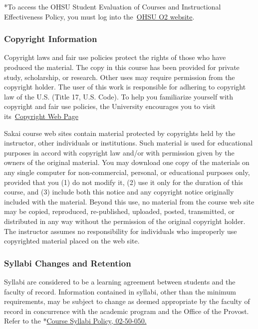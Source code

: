 \documentclass[
  letterpaper,
  DIV=11,
  numbers=noendperiod]{scrartcl}
\begin{document}
*To access the OHSU Student Evaluation of Courses and Instructional
Effectiveness Policy, you must log into
the~\href{https://o2.ohsu.edu/}{OHSU O2 website}.

\subsubsection{Copyright Information}\label{copyright-information}

Copyright laws and fair use policies protect the rights of those who
have produced the material. The copy in this course has been provided
for private study, scholarship, or research. Other uses may require
permission from the copyright holder. The user of this work is
responsible for adhering to copyright law of the U.S. (Title 17, U.S.
Code). To help you familiarize yourself with copyright and fair use
policies, the University encourages you to visit
its~\href{https://www.ohsu.edu/xd/education/library/services/copyright/}{Copyright
Web Page}

Sakai course web sites contain material protected by copyrights held by
the instructor, other individuals or institutions. Such material is used
for educational purposes in accord with copyright law and/or with
permission given by the owners of the original material. You may
download one copy of the materials on any single computer for
non-commercial, personal, or educational purposes only, provided that
you (1) do not modify it, (2) use it only for the duration of this
course, and (3) include both this notice and any copyright notice
originally included with the material. Beyond this use, no material from
the course web site may be copied, reproduced, re-published, uploaded,
posted, transmitted, or distributed in any way without the permission of
the original copyright holder. The instructor assumes no responsibility
for individuals who improperly use copyrighted material placed on the
web site.

\subsubsection{Syllabi Changes and
Retention}\label{syllabi-changes-and-retention}

Syllabi are considered to be a learning agreement between students and
the faculty of record. Information contained in syllabi, other than the
minimum requirements, may be subject to change as deemed appropriate by
the faculty of record in concurrence with the academic program and the
Office of the Provost. Refer to the
*\href{https://o2.ohsu.edu/policies-and-compliance/ohsu-policy-manual/chapter-2-student-affairs/ohsu-policy-02-50-050.cfm}{Course
Syllabi Policy, 02-50-050.}
\end{document}
